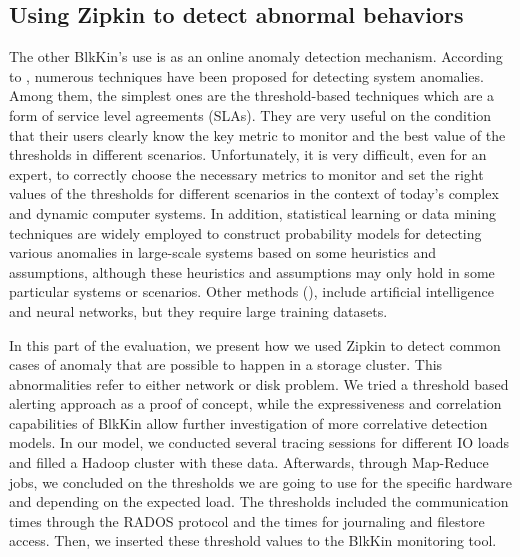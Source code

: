 \subsection{Using Zipkin to detect abnormal behaviors}

The other BlkKin's use is as an online anomaly detection mechanism. According to
\cite{china-detector}, numerous techniques have been proposed for detecting
system anomalies. Among them, the simplest ones are the threshold-based
techniques which are a form of service level agreements (SLAs). They are very
useful on the condition that their users clearly know the key metric to monitor
and the best value of the thresholds in different scenarios. Unfortunately, it
is very difficult, even for an expert, to correctly choose the necessary metrics
to monitor and set the right values of the thresholds for different scenarios in
the context of today's complex and dynamic computer systems. In addition,
statistical learning or data mining techniques are widely employed to construct
probability models for detecting various anomalies in large-scale systems based
on some heuristics and assumptions, although these heuristics and assumptions
may only hold in some particular systems or scenarios. Other methods
(\cite{syslog-svm}), include artificial intelligence and neural networks, but
they require large training datasets.

In this part of the evaluation, we present how we used Zipkin to detect common
cases of anomaly that are possible to happen in a storage cluster. This
abnormalities refer to either network or disk problem. We tried a threshold
based alerting approach as a proof of concept, while the expressiveness and
correlation capabilities of BlkKin allow further investigation of more
correlative detection models. In our model, we conducted several tracing
sessions for different IO loads and filled a Hadoop cluster with these data.
Afterwards, through Map-Reduce jobs, we concluded on the thresholds we are going
to use for the specific hardware and depending on the expected load. The
thresholds included the communication times through the RADOS protocol and the
times for journaling and filestore access. Then, we inserted these threshold
values to the BlkKin monitoring tool. 


